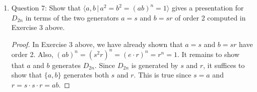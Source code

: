 \documentclass{article}
\begin{document}
\begin{enumerate}
\begin{enumerate}
\begin{proof}
          We show by induction on $k$ that all such elements $sr^k$ has
          order 2. The base case is true since $s$ has order 2. For the
          inductive step,
          \begin{align*}
            (sr^{k+1})^2  &= sr^{k+1}sr^{k+1}     && \\
                          &= sr^k(rs)r^{k+1}      && \\
                          &= sr^k(sr^{-1})r^{k+1} && (rs=sr^{-1}) \\
                          &= sr^ksr^k             && \\
                          &= (sr^k)(sr^k)         && \\
                          &= (sr^k)^2             && \\
                          &= e                    && \text{(induction).} \\
          \end{align*}
        \end{proof}
      \item Question 7: Show that $\langle a,b\,|\, a^2=b^2=(ab)^n=1\rangle$
        gives a presentation for $D_{2n}$ in terms of the two generators
        $a=s$ and $b=sr$ of order 2 computed in Exercise 3 above.
        \begin{proof}
          In Exercise 3 above, we have already shown that $a=s$ and $b=sr$
          have order 2. Also, $(ab)^n=(s^2r)^n=(e\cdot r)^n=r^n=1$.
          It remains to show that $a$ and $b$ generates $D_{2n}$.
          Since $D_{2n}$ is generated by $s$ and $r$, it suffices to show
          that $\{a,b\}$ generates both $s$ and $r$. This is true since
          $s=a$ and $r=s\cdot s\cdot r=ab$.
        \end{proof}
    \end{enumerate}


\end{enumerate}
\end{document}

